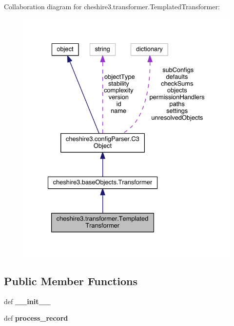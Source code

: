 Collaboration diagram for cheshire3.\-transformer.\-Templated\-Transformer\-:
\nopagebreak
\begin{figure}[H]
\begin{center}
\leavevmode
\includegraphics[width=331pt]{classcheshire3_1_1transformer_1_1_templated_transformer__coll__graph}
\end{center}
\end{figure}
\subsection*{Public Member Functions}
\begin{DoxyCompactItemize}
\item 
\hypertarget{classcheshire3_1_1transformer_1_1_templated_transformer_a82d787e9b78d9b52e4c46b6b117dbf12}{def {\bfseries \-\_\-\-\_\-init\-\_\-\-\_\-}}\label{classcheshire3_1_1transformer_1_1_templated_transformer_a82d787e9b78d9b52e4c46b6b117dbf12}

\item 
\hypertarget{classcheshire3_1_1transformer_1_1_templated_transformer_a53b787c0ec9b6f6e1158a43f37e8277b}{def {\bfseries process\-\_\-record}}\label{classcheshire3_1_1transformer_1_1_templated_transformer_a53b787c0ec9b6f6e1158a43f37e8277b}

\end{DoxyCompactItemize}
